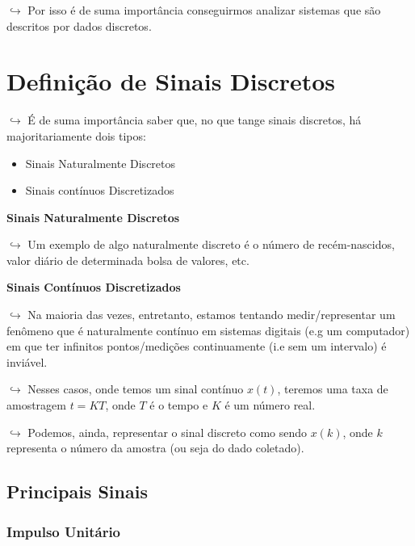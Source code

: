 \documentclass{article}
\begin{document}
\begin{itemize}
\(\hookrightarrow\) Por isso é de suma importância conseguirmos analizar
sistemas que são descritos por dados discretos.

\hypertarget{definiuxe7uxe3o-de-sinais-discretos}{%
\section{Definição de Sinais
Discretos}\label{definiuxe7uxe3o-de-sinais-discretos}}

\(\hookrightarrow\) É de suma importância saber que, no que tange sinais
discretos, há majoritariamente dois tipos:

\begin{itemize}
\tightlist
\item
  Sinais Naturalmente Discretos
\item
  Sinais contínuos Discretizados
\end{itemize}

\textbf{Sinais Naturalmente Discretos}

\(\hookrightarrow\) Um exemplo de algo naturalmente discreto é o número
de recém-nascidos, valor diário de determinada bolsa de valores, etc.

\textbf{Sinais Contínuos Discretizados}

\(\hookrightarrow\) Na maioria das vezes, entretanto, estamos tentando
medir/representar um fenômeno que é naturalmente contínuo em sistemas
digitais (e.g um computador) em que ter infinitos pontos/medições
continuamente (i.e sem um intervalo) é inviável.

\(\hookrightarrow\) Nesses casos, onde temos um sinal contínuo \(x(t)\),
teremos uma taxa de amostragem \(t = KT\), onde \(T\) é o tempo e \(K\)
é um número real.

\(\hookrightarrow\) Podemos, ainda, representar o sinal discreto como
sendo \(x(k)\), onde \(k\) representa o número da amostra (ou seja do
dado coletado).

\hypertarget{principais-sinais}{%
\subsection{Principais Sinais}\label{principais-sinais}}

\hypertarget{impulso-unituxe1rio}{%
\subsubsection{Impulso Unitário}\label{impulso-unituxe1rio}}


\end{itemize}
\end{document}
